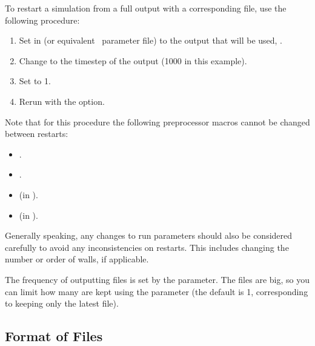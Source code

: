 To restart a simulation from a full  output with a
corresponding  file, use the following procedure:
\begin{enumerate}
\item Set  in  (or equivalent
  \pkd\ parameter file) to the  output that will be used, \eg
  .
\item Change  to the timestep of the output (1000 in
  this example).
\item Set  to 1.
\item Rerun with the  option.
\end{enumerate}
Note that for this procedure the following preprocessor macros cannot
be changed between restarts:
\begin{itemize}
\item {}.
\item {}.
\item {} (in ).
\item {} (in
  ).
\end{itemize}
Generally speaking, any changes to run parameters should also be
considered carefully to avoid any inconsistencies on restarts.  This
includes changing the number or order of walls, if applicable.

The frequency of outputting  files is set by the
 parameter.  The  files are big, so you
can limit how many are kept using the  parameter
(the default is 1, corresponding to keeping only the latest
 file).

\subsection{Format of  Files}

